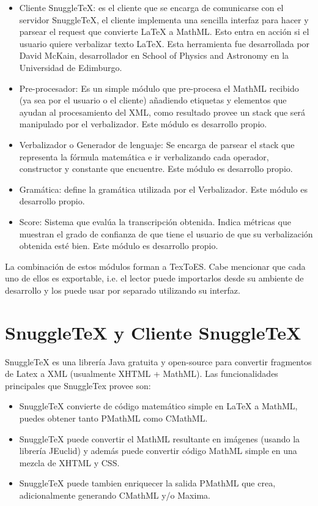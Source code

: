 \begin{itemize}
\item Cliente SnuggleTeX: es el cliente que se encarga de comunicarse con el servidor SnuggleTeX, el cliente implementa una sencilla interfaz para hacer y parsear el request que convierte LaTeX a MathML. Esto entra en acción si el usuario quiere verbalizar texto LaTeX. Esta herramienta fue desarrollada por David McKain, desarrollador en School of Physics and Astronomy en la Universidad de Edimburgo.
\item Pre-procesador: Es un simple módulo que pre-procesa el MathML recibido (ya sea por el usuario o el cliente) añadiendo etiquetas y elementos que ayudan al procesamiento del XML, como resultado provee un stack que será manipulado por el verbalizador. Este módulo es desarrollo propio.
\item Verbalizador o Generador de lenguaje: Se encarga de parsear el stack que representa la fórmula matemática e ir verbalizando cada operador, constructor y constante que encuentre. Este módulo es desarrollo propio.
\item Gramática: define la gramática utilizada por el Verbalizador. Este módulo es desarrollo propio.
\item Score: Sistema que evalúa la transcripción obtenida. Indica métricas que muestran el grado de confianza de que tiene el usuario de que su verbalización obtenida esté bien. Este módulo es desarrollo propio.
\end{itemize}

La combinación de estos módulos forman a TexToES. Cabe mencionar que cada uno de ellos es exportable, i.e. el lector puede importarlos desde su ambiente de desarrollo y los puede usar por separado utilizando su interfaz.

\section{SnuggleTeX y Cliente SnuggleTeX}

SnuggleTeX\cite{3} es una librería Java gratuita y open-source para convertir fragmentos de Latex a XML (usualmente XHTML + MathML). Las funcionalidades principales que SnuggleTex provee son:

\begin{itemize}
\item SnuggleTeX convierte de código matemático simple en LaTeX a MathML, puedes obtener tanto PMathML como CMathML.
\item SnuggleTeX puede convertir el MathML resultante en imágenes (usando la librería JEuclid) y además puede convertir código MathML simple en una mezcla de XHTML y CSS.
\item SnuggleTeX puede tambien enriquecer la salida PMathML que crea, adicionalmente generando CMathML y/o Maxima.
\end{itemize}

